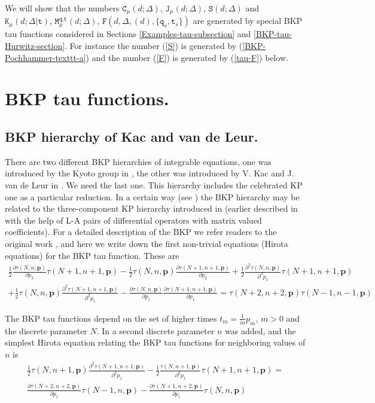 \documentclass[a4paper,10pt]{article}
\newcommand{\bpow}{\mathbf{p}}
\theoremstyle{plain}
\theoremstyle{remark}
\def\bea{\begin{eqnarray}}
\def\eea{\end{eqnarray}}
\begin{document}
 We will show that the numbers $\texttt{C}_\mu(d;\Delta)$, $\texttt{J}_\mu(d;\Delta)$, $\texttt{S}(d;\Delta)$ and
 $\texttt{K}_{\mu}(d;\Delta|\texttt{t})$,
 $\texttt{M}^{\texttt{q},\texttt{t}}_{\mu}(d;\Delta)$, $\texttt{F}(d,\Delta,(d),\{\texttt{q}_s,\texttt{t}_s\})$ are generated by
 special BKP tau functions considered
 in Sections \ref{Examples-tau-subsection} and \ref{BKP-tau-Hurwitz-section}. For instance the number (\ref{S}) is generated by
 (\ref{BKP-Pochhammer-texttt-a}) and the number (\ref{F}) is generated by (\ref{tau-F}) below.





\section{BKP tau functions. \label{BKP-tau-function}}

\subsection{BKP hierarchy of Kac and van de Leur.}




There are two different BKP hierarchies of integrable equations, one was introduced by the Kyoto group in
\cite{JM}, the other was
introduced by V. Kac and J. van de Leur in \cite{KvdLbispec}. We need the last one. This hierarchy includes
the celebrated
KP one as a particular reduction.  In a
certain way (see \cite{LeurO-2014}) the BKP hierarchy may be related to the three-component KP hierarchy
introduced in \cite{JM}
(earlier described in \cite{ZakharovShabat} with the help of L-A pairs of differential operators with matrix
valued coefficients).
For a detailed
description of the BKP we refer readers to the original work \cite{KvdLbispec}, and here
we write down the first non-trivial equations (Hirota equations) for the BKP tau function. These are
\bea\label{Hirota-elementary-1'}
\frac 12 \frac{\partial\tau(N,n,\bpow)}{\partial p_2} \tau(N+1,n+1,\bpow)-
\frac 12 \tau(N,n,\bpow)\frac{\partial\tau(N+1,n+1,\bpow)}{\partial p_2} \nonumber
+\frac 12 \frac{\partial^2\tau(N,n,\bpow)}{\partial^2 p_1} \tau(N+1,n+1,\bpow)\\
+\frac 12 \tau(N,n,\bpow)\frac{\partial^2\tau(N+1,n+1,\bpow)}{\partial^2 p_1}
- \frac{\partial\tau(N,n,\bpow)}{\partial p_1}\frac{\partial\tau(N+1,n+1,\bpow)}{\partial p_1}
=\tau(N+2,n+2,\bpow)\tau(N-1,n-1,\bpow)
\eea


The BKP tau functions depend on the set of higher times $t_m=\frac 1m p_m$, $m>0$ and the discrete parameter
$N$.
In \cite{OST-I}  a second discrete parameter $n$ was added, and the simplest Hirota equation relating the
BKP tau
functions for neighboring values of $n$ is
\bea\label{Hirota-elementary-2'}
\frac 12 \tau(N,n+1,\bpow)\frac{\partial^2 \tau(N+1,n+1,\bpow)}{\partial^2 p_1}-
\frac 12 \frac{\tau(N,n+1,\bpow)}{\partial^2 p_1} \tau(N+1,n+1,\bpow)=\nonumber
\\
\frac{\partial\tau(N+2,n+2,\bpow)}{\partial p_1}\tau(N-1,n,\bpow)-
 \frac{\partial \tau(N+1,n+2,\bpow)}{\partial p_1}\tau(N,n,\bpow)
\eea
\end{document}
